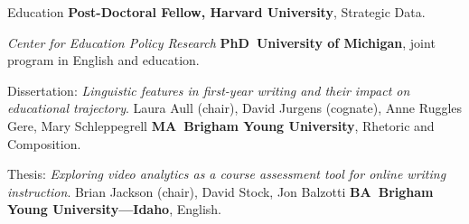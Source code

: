 \begin{rubric}{Education}
\entry*[2023 -- \dots]%
	\textbf{Post-Doctoral Fellow, Harvard University}, Strategic Data.
	\par\emph{Center for Education Policy Research}
%
\entry*[2019 -- 2024]%
	\textbf{PhD~University of Michigan}, joint program in English and education.\par
	Dissertation: \emph{Linguistic features in first-year writing and their impact on educational trajectory}. Laura Aull (chair), David Jurgens (cognate), Anne Ruggles Gere, Mary Schleppegrell 
% 
\entry*[2016 -- 2018]%
	\textbf{MA~Brigham Young University}, Rhetoric and Composition.\par
	Thesis: \emph{Exploring video analytics as a course assessment tool for online writing instruction}. Brian Jackson (chair), David Stock, Jon Balzotti
\entry*[2010 -- 2015]%
\textbf{BA~Brigham Young University---Idaho}, English.\par
\end{rubric}
